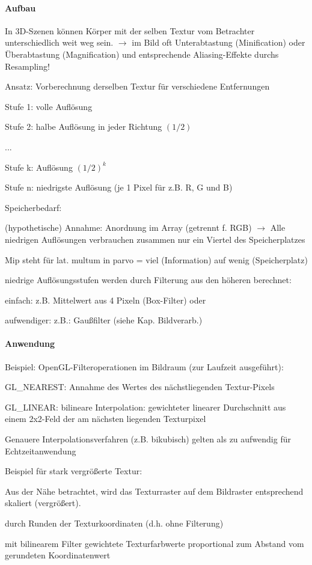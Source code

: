 \documentclass[landscape]{article}
\begin{document}
\begin{multicols}{3}
  \paragraph{Aufbau}
  \begin{itemize*}
    \item In 3D-Szenen können Körper mit der selben Textur vom Betrachter unterschiedlich weit weg sein. $\rightarrow$ im Bild oft Unterabtastung (Minification) oder Überabtastung (Magnification) und entsprechende Aliasing-Effekte durchs Resampling!
    \item Ansatz: Vorberechnung derselben Textur für verschiedene Entfernungen
    \item Stufe 1: volle Auflösung
    \item Stufe 2: halbe Auflösung in jeder Richtung $(1/2)$
    \item ...
    \item Stufe k: Auflösung $(1/2)^k$
    \item Stufe n: niedrigste Auflösung (je 1 Pixel für z.B. R, G und B)
    \item Speicherbedarf:
    \item (hypothetische) Annahme: Anordnung im Array (getrennt f. RGB) $\rightarrow$ Alle niedrigen Auflösungen verbrauchen zusammen nur ein Viertel des Speicherplatzes
    \item Mip steht für lat. multum in parvo = viel (Information) auf wenig (Speicherplatz)
    \item niedrige Auflösungsstufen werden durch Filterung aus den höheren berechnet:
    \item einfach: z.B. Mittelwert aus 4 Pixeln (Box-Filter) oder
    \item aufwendiger: z.B.: Gaußfilter (siehe Kap. Bildverarb.)
  \end{itemize*}
  
  \paragraph{Anwendung}
  \begin{itemize*}
    \item Beispiel: OpenGL-Filteroperationen im Bildraum (zur Laufzeit ausgeführt):
    \item GL\_NEAREST: Annahme des Wertes des nächstliegenden Textur-Pixels
    \item GL\_LINEAR: bilineare Interpolation: gewichteter linearer Durchschnitt aus einem 2x2-Feld der am nächsten liegenden Texturpixel
    \item Genauere Interpolationsverfahren (z.B. bikubisch) gelten als zu aufwendig für Echtzeitanwendung
    \item Beispiel für stark vergrößerte Textur:
    \item Aus der Nähe betrachtet, wird das Texturraster auf dem Bildraster entsprechend skaliert (vergrößert).
    \item durch Runden der Texturkoordinaten (d.h. ohne Filterung)
    \item mit bilinearem Filter gewichtete Texturfarbwerte proportional zum Abstand vom gerundeten Koordinatenwert
  \end{itemize*}
  

\end{multicols}
\end{document}
